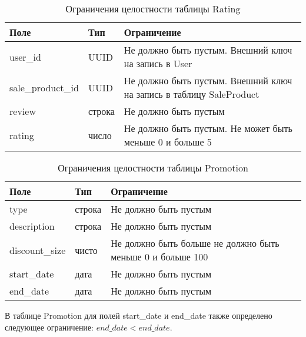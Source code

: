 \begin{table}[!h]
	\begin{center}
		\begin{threeparttable}
			\caption{Ограничения целостности таблицы Rating}
			\label{tbl:entity_rating}
			\begin{tabular}{|p{4.5cm}|p{2.5cm}|p{8.5cm}|}
				\hline 
				\textbf{Поле} & \textbf{Тип} & \textbf{Ограничение}  \\
				\hline
				user\_id & UUID & Не должно быть пустым. Внешний ключ на запись в User  \\
				\hline
				sale\_product\_id & UUID & Не должно быть пустым. Внешний ключ на запись в таблицу SaleProduct  \\
				\hline
				review & строка & Не должно быть пустым \\
				\hline
				rating & число & Не должно быть пустым. Не может быть меньше 0 и больше 5 \\
				\hline
			\end{tabular}
		\end{threeparttable}			
	\end{center}
\end{table}

\begin{table}[ht]
	\begin{center}
		\begin{threeparttable}
			\caption{Ограничения целостности таблицы Promotion}
			\label{tbl:entity_promotion}
			\begin{tabular}{|p{4.5cm}|p{2.5cm}|p{8.5cm}|}
				\hline 
				\textbf{Поле} & \textbf{Тип} & \textbf{Ограничение}  \\
				\hline
				type & строка & Не должно быть пустым  \\
				\hline
				description & строка & Не должно быть пустым  \\
				\hline
				discount\_size & чисто & Не должно быть больше не должно быть меньше 0 и больше 100 \\
				\hline
				start\_date & дата & Не должно быть пустым \\
				\hline
				end\_date & дата & Не должно быть пустым \\
				\hline
			\end{tabular}
		\end{threeparttable}			
	\end{center}
\end{table}

В таблице Promotion для полей start\_date и end\_date также определено следующее ограничение: $ end\_date < end\_date $.

